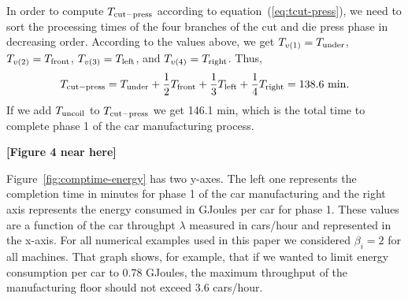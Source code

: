 \documentclass[a4paper, 12pt]{article} %
\begin{document}
In order to compute $T_{\rm cut-press}$ according to equation~(\ref{eq:tcut-press}), we need to sort the processing times of the four branches of the cut and die press phase in decreasing order. According to the values above, we get $T_{v(1)} = T_{\rm under}$, $T_{v(2)} = T_{\rm front}$, $T_{v(3)} = T_{\rm left}$, and $T_{v(4)} = T_{\rm right}$. Thus,
\begin{equation}
T_{\rm cut-press} = T_{\rm under} + \frac{1}{2} T_{\rm front} + \frac{1}{3}  T_{\rm left} +
                                   \frac{1}{4} T_{\rm right}  \\ \nonumber
                              =  138.6 ~{\rm min}.
\end{equation}
If we add $T_{\rm uncoil}$ to $T_{\rm cut-press}$ we get 146.1 min, which is the total time to complete phase 1 of the car manufacturing process.

{\bf [Figure 4 near here]}

Figure~\ref{fig:comptime-energy} has two y-axes. The left one represents the completion time in minutes for phase 1 of the car manufacturing and the right axis represents the energy consumed in GJoules per car for phase 1. These values are a function of the car throughpt $\lambda$ measured in cars/hour and  represented in the x-axis. For all numerical examples used in this paper we considered $\beta_i = 2$ for all machines. That graph  shows, for example,  that if we wanted to limit energy consumption per car to  0.78 GJoules, the maximum throughput of the manufacturing floor should not exceed 3.6 cars/hour.
\end{document}
